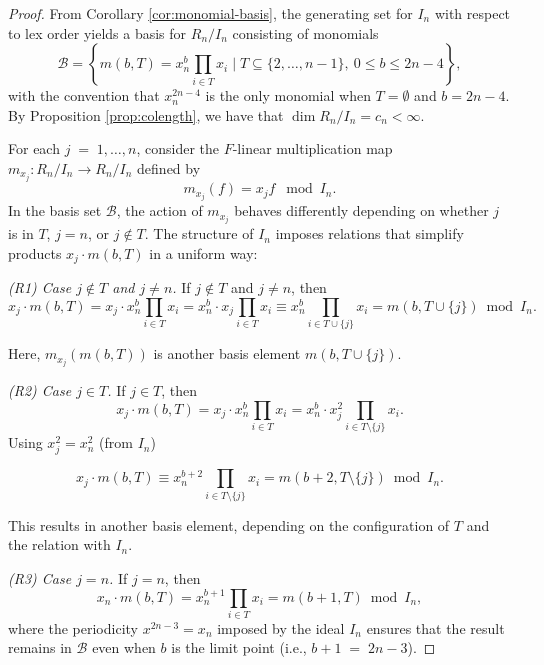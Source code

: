 \documentclass[11pt]{amsart}
\theoremstyle{plain}
\theoremstyle{definition}
\theoremstyle{remark}
\begin{document}
\begin{proof}
	
	From Corollary \ref{cor:monomial-basis}, the generating set for \( I_n \) with respect to lex order yields a basis for \( R_n / I_n \) consisting of monomials
	\[
	\mathcal{B} = \left\{  m(b, T) = x_n^b \prod_{i \in T} x_i \mid T \subseteq \{2, \dots, n-1\},\ 0 \leq b \leq 2n-4 \right\},
	\]
	with the convention that \( x_n^{2n-4} \) is the only monomial when \( T = \emptyset \) and \( b = 2n-4 \). By Proposition \ref{prop:colength}, we have that $\dim R_n/I_n = c_n < \infty $.
	
	For each \( j \;=\; 1,\dots, n \), consider the \( F\)-linear multiplication map \( m_{x_j}: R_n/I_n \rightarrow R_n/I_n \) defined by	
	\[
	m_{x_j}(f) = x_j f\; \bmod{ I_n}.
	\]  In the basis set \(\mathcal{B}\), the action of \( m_{x_j} \) behaves differently depending on whether \(j\) is in \(T\), \(j=n\), or \(j \notin T \).	The structure of \(I_n\) imposes relations that simplify products \( x_j \cdot m(b, T) \) in a uniform way:
	
	
	\noindent \textit{(R1) \;\; Case \( j \notin T \) and \( j \neq n \).} If \( j \notin T \) and \( j \neq n \), then	
	\[
	x_j \cdot m(b, T) = x_j \cdot x_n^b \prod_{i \in T} x_i = x_n^b \cdot x_j \prod_{i \in T} x_i \equiv x_n^b \prod_{i \in T \cup \{j\}} x_i = m(b, T \cup \{j\}) \bmod{ I_n}.
	\]
	
	Here, \( m_{x_j}(m(b, T)) \) is another basis element \( m(b, T \cup \{j\}) \).
	
	\noindent \textit{(R2) \;\; Case \( j \in T \).} If \( j \in T \), then	
	\[
	x_j \cdot m(b, T) = x_j \cdot x_n^b \prod_{i \in T} x_i  = x_n^b \cdot x_j^2 \prod_{i \in T \setminus \{j\}} x_i.
	\] Using \( x_j^2 = x_n^2 \) (from \( I_n \)) 
	
	\[
	x_j \cdot m(b, T) \equiv x_n^{b + 2} \prod_{i \in T \setminus \{j\}} x_i = m(b+2, T\setminus \{j\}) \bmod{ I_n} .
	\] 
	
	This results in another basis element, depending on the configuration of \( T \) and the relation with \( I_n \). 
	
	\noindent \textit{(R3)\;\; Case \( j = n \).} If \( j = n \), then	
	\[
	x_n \cdot m(b, T) = x_n^{b+1} \prod_{i \in T} x_i = m(b+1, T) \bmod{ I_n} ,
	\] where the periodicity \( x^{2n-3} = x_n \) imposed by the ideal \( I_n \) ensures that the result remains in \( \mathcal{B} \) even when \(b\) is the limit point (i.e., \( b + 1 \;=\; 2n-3 \)). 	
	

\end{proof}
\end{document}
